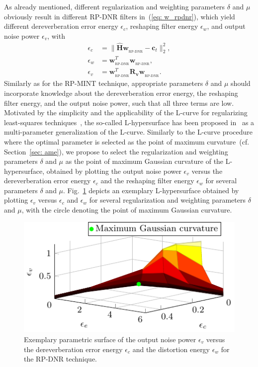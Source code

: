 \documentclass{aes60i}
\begin{document}
As already mentioned, different regularization and weighting parameters $\delta$ and $\mu$ obviously result in different RP-DNR filters in~(\ref{eq: w_rpdnr}), which yield different dereverberation error energy $\epsilon_{c}$, reshaping filter energy $\epsilon_{w}$, and output noise power $\epsilon_{v}$, with
\begin{align}
  \epsilon_c & = \|\hat{\mathbf{H}} \mathbf{w}_{_{\text{RP-DNR}}} -\mathbf{c}_t \|_2^2, \\
  \epsilon_w  & = \mathbf{w}^T_{_{\text{RP-DNR}}}\mathbf{w}^{}_{_{\text{RP-DNR}}},  \\
  \epsilon_v &= \mathbf{w}^T_{_{\text{RP-DNR}}} \mathbf{R}_{\mathbf{v}}\mathbf{w}^{}_{_{\text{RP-DNR}}}.
\end{align}
Similarly as for the RP-MINT technique, appropriate parameters $\delta$ and $\mu$ should incorporate knowledge about the dereverberation error energy, the reshaping filter energy, and the output noise power, such that all three terms are low.
Motivated by the simplicity and the applicability of the L-curve for regularizing least-squares techniques~\cite{Hansen_1993}, the so-called L-hypersurface has been proposed in~\cite{Belge_SPIE_1998} as a multi-parameter generalization of the L-curve. 
Similarly to the L-curve procedure where the optimal parameter is selected as the point of maximum curvature~(cf. Section~\ref{sec: ame}), we propose to select the regularization and weighting parameters $\delta$ and $\mu$ as the point of maximum Gaussian curvature of the L-hypersurface, obtained by plotting the output noise power $\epsilon_v$ versus the dereverberation error energy $\epsilon_c$ and the reshaping filter energy $\epsilon_w$ for several parameters $\delta$ and $\mu$.
\newline
Fig.~\ref{fig: L3} depicts an exemplary L-hypersurface obtained by plotting $\epsilon_{v}$ versus $\epsilon_c$ and $\epsilon_w$ for several regularization and weighting parameters $\delta$ and $\mu$, with the circle denoting the point of maximum Gaussian curvature.
\begin{figure}[t!]
\centering
\includegraphics[scale=0.8]{Plots/L3}
\caption{Exemplary parametric surface of the output noise power $\epsilon_v$ versus the dereverberation error energy $\epsilon_c$ and the distortion energy $\epsilon_w$ for the RP-DNR technique.}
\label{fig: L3}
\end{figure}
\end{document}
